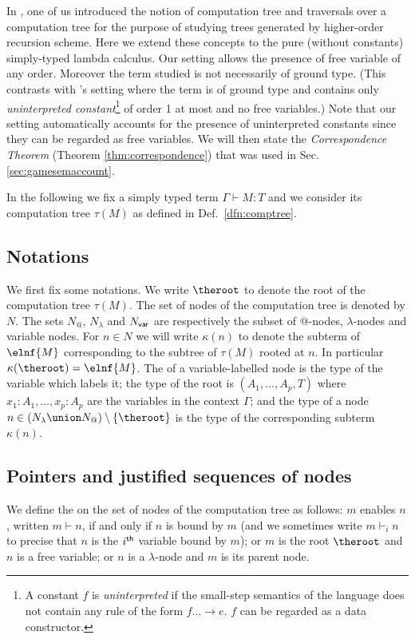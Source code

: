 In \cite{OngLics2006}, one of us introduced the notion of
computation tree and traversals over a computation tree for the
purpose of studying trees generated by higher-order recursion
scheme. Here we extend these concepts to the pure (\ie without
constants) simply-typed lambda calculus. Our setting allows the
presence of free variable of any order. Moreover the term studied is
not necessarily of ground type. (This contrasts with
\cite{OngLics2006}'s setting where the term is of ground type and
contains only \emph{uninterpreted constant}\footnote{A constant $f$
is  \emph{uninterpreted} if the small-step semantics of the language
  does not contain any rule of the form $f \dots \rightarrow e$. $f$
  can be regarded as a data constructor.} of order 1 at most and no
free variables.) Note that our setting automatically accounts for
the presence of uninterpreted constants since they can be regarded
as free variables. We will then state the \emph{Correspondence
Theorem} (Theorem \ref{thm:correspondence}) that was used in Sec.
\ref{sec:gamesemaccount}.

In the following we fix a simply typed term $\Gamma \vdash M :T$ and
we consider its computation tree $\tau(M)$ as defined in Def.\
\ref{dfn:comptree}.

\subsection{Notations}
We first fix some notations. We write $\theroot$ to denote the root
of the computation tree $\tau(M)$. The set of nodes of the
computation tree is denoted by $N$. The sets $N_@$, $N_\lambda$ and
$N_{\sf var}$ are respectively the subset of @-nodes,
$\lambda$-nodes and variable nodes. For $n \in N$ we will write
$\kappa(n)$ to denote the subterm of $\elnf{M}$ corresponding to the
subtree of $\tau(M)$ rooted at $n$. In particular $\kappa(\theroot)
= \elnf{M}$. The \defname{type} of a variable-labelled node is the
type of the variable which labels it; the type of the root is
$(A_1,\ldots,A_p, T)$ where $x_1:A_1,\ldots, x_p:A_p$ are the
variables in the context $\Gamma$; and the type of a node $n\in
(N_\lambda \union N_@) \setminus \{ \theroot \}$ is the type of the
corresponding subterm $\kappa(n)$.


\subsection{Pointers and justified sequences of nodes}

We define the  on the set of nodes of the
computation tree as follows: $m$ enables $n$, written $m \vdash n$,
if and only if $n$ is bound by $m$ (and we sometimes write $m
\vdash_i n$ to precise that $n$ is the $i^{\sf th}$ variable bound
by $m$); or $m$ is the root $\theroot$ and $n$ is a free variable;
or $n$ is a $\lambda$-node and $m$ is its parent node.



